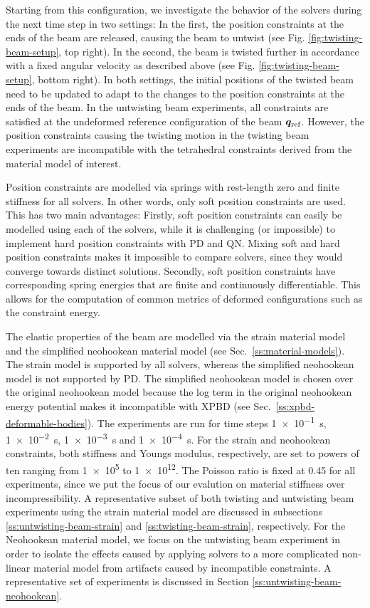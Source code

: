 Starting from this configuration, we investigate the behavior of the 
solvers during the next time step in two settings: In the first, the position constraints at the ends of the beam are released, causing the 
beam to untwist (see Fig. \ref{fig:twisting-beam-setup}, top right). In the second, the beam is twisted further in accordance with a fixed angular
velocity as described above (see Fig. \ref{fig:twisting-beam-setup}, bottom right). In both settings, the initial positions of the twisted beam 
need to be updated to adapt to the changes to the position constraints at the ends of the beam. In the untwisting beam experiments, all constraints are satisfied at the 
undeformed reference configuration of the beam $\bm{q}_\text{ref}$. However, the position constraints causing the twisting motion in the twisting beam experiments are 
incompatible with the tetrahedral constraints derived from the material model of interest. 

Position constraints are modelled via springs with rest-length zero and finite stiffness for all solvers. In other words, only soft position constraints 
are used. This has two main advantages: Firstly, soft position constraints can easily be modelled using each of the solvers, while it is challenging (or impossible) to 
implement hard position constraints with PD and QN. Mixing soft and hard position constraints makes it impossible to compare solvers,
since they would converge towards distinct solutions. Secondly, soft position constraints have corresponding spring energies that are 
finite and continuously differentiable. This allows for the computation of common metrics of deformed configurations such as the constraint 
energy. 

The elastic properties of the beam are modelled via the strain material model and the simplified neohookean 
material model (see Sec.\ \ref{ss:material-models}). The strain model is supported by all solvers, whereas the simplified neohookean model is 
not supported by PD. The simplified neohookean model is chosen over the original neohookean model because the log term in the original 
neohookean energy potential makes it incompatible with XPBD (see Sec.\ \ref{ss:xpbd-deformable-bodies}). The experiments are run for time steps 
\SI{1e-1}{\second}, \SI{1e-2}{\second}, \SI{1e-3}{\second} and \SI{1e-4}{\second}. For the strain and neohookean constraints, both 
stiffness and Youngs modulus, respectively, are set to powers of ten ranging from \num{1e5} to \num{1e12}. The Poisson ratio is fixed 
at 0.45 for all experiments, since we put the focus of our evalution on material stiffness over incompressibility. A representative subset of both twisting and untwisting 
beam experiments using the strain material model are discussed in subsections \ref{ss:untwisting-beam-strain} and \ref{ss:twisting-beam-strain}, respectively. For the 
Neohookean material model, we focus on the untwisting beam experiment in order to isolate the effects caused by applying solvers to a more complicated non-linear material 
model from artifacts caused by incompatible constraints. A representative set of experiments is discussed in Section \ref{ss:untwisting-beam-neohookean}.

